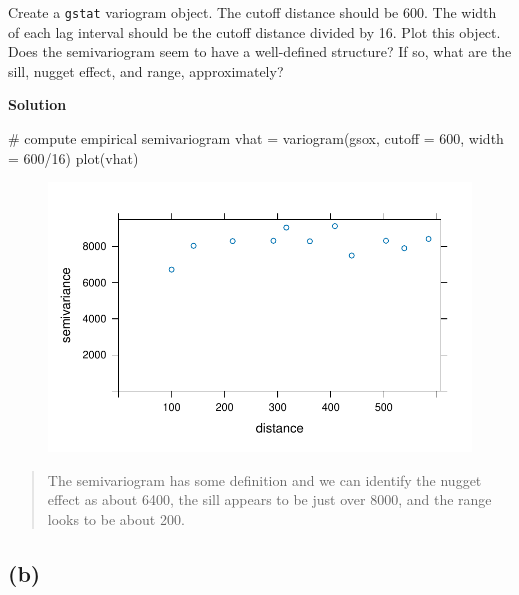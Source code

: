 \documentclass[
  letterpaper,
  DIV=11,
  numbers=noendperiod]{scrartcl}
\newenvironment{Shaded}{\begin{snugshade}}{\end{snugshade}}
\newcommand{\AttributeTok}[1]{\textcolor[rgb]{0.40,0.45,0.13}{#1}}
\newcommand{\CommentTok}[1]{\textcolor[rgb]{0.37,0.37,0.37}{#1}}
\newcommand{\DecValTok}[1]{\textcolor[rgb]{0.68,0.00,0.00}{#1}}
\newcommand{\FunctionTok}[1]{\textcolor[rgb]{0.28,0.35,0.67}{#1}}
\newcommand{\NormalTok}[1]{\textcolor[rgb]{0.00,0.23,0.31}{#1}}
\newcommand{\OtherTok}[1]{\textcolor[rgb]{0.00,0.23,0.31}{#1}}
\newcommand{\SpecialCharTok}[1]{\textcolor[rgb]{0.37,0.37,0.37}{#1}}
\begin{document}
Create a \texttt{gstat} variogram object. The cutoff distance should be
600. The width of each lag interval should be the cutoff distance
divided by 16. Plot this object. Does the semivariogram seem to have a
well-defined structure? If so, what are the sill, nugget effect, and
range, approximately?

\textbf{Solution}

\begin{Shaded}
\begin{Highlighting}[]
\CommentTok{\# compute empirical semivariogram}
\NormalTok{vhat }\OtherTok{=} \FunctionTok{variogram}\NormalTok{(gsox, }\AttributeTok{cutoff =} \DecValTok{600}\NormalTok{, }\AttributeTok{width =} \DecValTok{600}\SpecialCharTok{/}\DecValTok{16}\NormalTok{)}
\FunctionTok{plot}\NormalTok{(vhat)}
\end{Highlighting}
\end{Shaded}

\begin{figure}[H]

{\centering \includegraphics{geo-hw-spdep_files/figure-pdf/unnamed-chunk-3-1.pdf}

}

\end{figure}

\begin{quote}
The semivariogram has some definition and we can identify the nugget
effect as about 6400, the sill appears to be just over 8000, and the
range looks to be about 200.
\end{quote}

\hypertarget{b}{%
\subsection{(b)}\label{b}}
\end{document}
